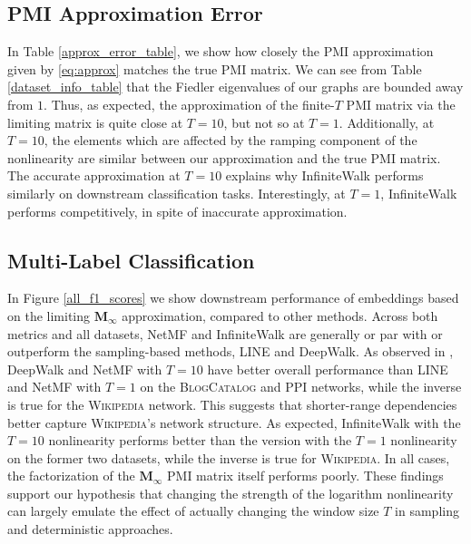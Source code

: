 \documentclass[sigconf]{acmart}
\newcommand{\bv}[1]{\mathbf{#1}}
\begin{document}
\subsection{PMI Approximation Error} In Table \ref{approx_error_table}, we show how closely the PMI approximation given by \eqref{eq:approx} matches the true PMI matrix. We can see from Table \ref{dataset_info_table} that the Fiedler eigenvalues of our graphs are bounded away from $1$. Thus, as expected, the approximation of the finite-$T$ PMI matrix via the limiting matrix is quite close at $T=10$, but not so at $T=1$.
Additionally, at $T=10$, the elements which are affected by the ramping component of the nonlinearity are similar between our approximation and the true PMI matrix.
The accurate approximation at $T=10$ explains why InfiniteWalk performs similarly on downstream classification tasks. Interestingly, at $T=1$, InfiniteWalk performs competitively, in spite of inaccurate approximation.



\subsection{Multi-Label Classification}
In Figure \ref{all_f1_scores} we show downstream performance of embeddings based on the limiting $\bv{M}_\infty$ approximation, compared to other methods. Across both metrics and all datasets, NetMF and InfiniteWalk are generally or par with or outperform the sampling-based methods, LINE and DeepWalk. As observed in \cite{qiu2018network}, DeepWalk and NetMF with $T=10$ have better overall performance than LINE and NetMF with $T=1$ on the \textsc{BlogCatalog} and \textsc{PPI} networks, while the inverse is true for the \textsc{Wikipedia} network. This suggests that shorter-range dependencies better capture \textsc{Wikipedia}'s network structure. As expected, InfiniteWalk with the $T=10$ nonlinearity performs better than the version with the $T=1$ nonlinearity on the former two datasets, while the inverse is true for \textsc{Wikipedia}. In all cases, the factorization of the $\bv{M_\infty}$ PMI matrix itself performs poorly. These findings support our hypothesis that changing the strength of the logarithm nonlinearity can largely emulate the effect of actually changing the window size $T$ in sampling and deterministic approaches.
\end{document}
